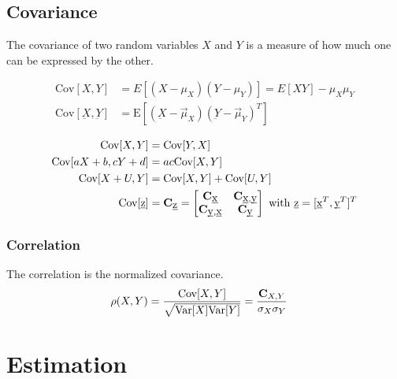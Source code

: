 \begin{mdframed}[style=eqbox]
  \subsection{Covariance}
  The covariance of two random variables $X$ and $Y$ is a measure of how much one can be expressed by the other.
  \begin{mdframed}[style=redbox]
    \begin{align*}
      \text{Cov}[X,Y] &= E[(X-\mu_X)(Y-\mu_Y)] = E[XY] - \mu_X\mu_Y\\
      \text{Cov}[\underbar{X},\underbar{Y}] &= \text{E}[(\underbar{X} - \vec{\mu}_X)(\underbar{Y} - \vec{\mu}_Y)^T]
    \end{align*}
  \end{mdframed}
  \begin{align*}
    \text{Cov}[X,Y] &= \text{Cov}[Y,X]\\
    \text{Cov}[aX + b, cY + d] &= ac \text{Cov}[X,Y]\\
    \text{Cov}[X + U, Y] &= \text{Cov}[X,Y] + \text{Cov}[U,Y]\\
    \text{Cov}[\underbar{z}] &= \mathbf{C}_{\underbar{z}} = \begin{bmatrix}
      \mathbf{C}_{\underbar{x}} & \mathbf{C}_{\underbar{x},\underbar{y}}\\
      \mathbf{C}_{\underbar{y},\underbar{x}} & \mathbf{C}_{\underbar{y}}
    \end{bmatrix} \text{~with~} \underbar{z} = [\underbar{x}^T, \underbar{y}^T]^T
  \end{align*}
  \subsubsection{Correlation}
  The correlation is the normalized covariance.
  \begin{align*}
    \rho(X,Y) &= \frac{\text{Cov}[X,Y]}{\sqrt{\text{Var}[X]\text{Var}[Y]}} = \frac{\mathbf{C}_{X,Y}}{\sigma_X \sigma_Y}
  \end{align*}
\end{mdframed}

\section{Estimation}

